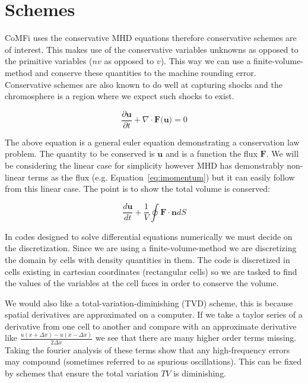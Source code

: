 \documentclass[12pt,upcase]{umlthesis}
\begin{document}
\section{Schemes}

CoMFi uses the conservative MHD equations therefore conservative schemes are of interest. This makes use of the conservative variables unknowns as opposed to the primitive variables ($n v$ as opposed to $v$). This way we can use a finite-volume-method and conserve these quantities to the machine rounding error. Conservative schemes are also known to do well at capturing shocks and the chromosphere is a region where we expect such shocks to exist.

\begin{equation}\label{eq:geneuler}
	\frac{\partial \textbf{u}}{\partial t} + \nabla \cdot \textbf{F(u)} = 0
\end{equation}

The above equation is a general euler equation demonstrating a conservation law problem. The quantity to be conserved is $\textbf{u}$ and is a function the flux $\textbf{F}$. We will be considering the linear case for simplicity however MHD has demonstrably non-linear terms as the flux (e.g. Equation~\ref{eq:imomentum}) but it can easily follow from this linear case. The point is to show the total volume is conserved:

\begin{equation}\label{eq:geneulerint}
	\frac{d\textbf{u}}{dt} + \frac{1}{V} \oint \textbf{F} \cdot \textbf{n} dS
\end{equation}

In codes designed to solve differential equations numerically we must decide on the discretization. Since we are using a finite-volume-method we are discretizing the domain by cells with density quantities in them. The code is discretized in cells existing in cartesian coordinates (rectangular cells) so we are tasked to find the values of the variables at the cell faces in order to conserve the volume.

We would also like a total-variation-diminishing (TVD) scheme, this is because spatial derivatives are approximated on a computer. If we take a taylor series of a derivative from one cell to another and compare with an approximate derivative like $\frac{u(x+\Delta x)-u(x-\Delta x)}{2\Delta x}$ we see that there are many higher order terms missing. Taking the fourier analysis of these terms show that any high-frequency errors may compound (sometimes referred to as spurious oscillations). This can be fixed by schemes that ensure the total variation $TV$ is diminishing.
\end{document}
